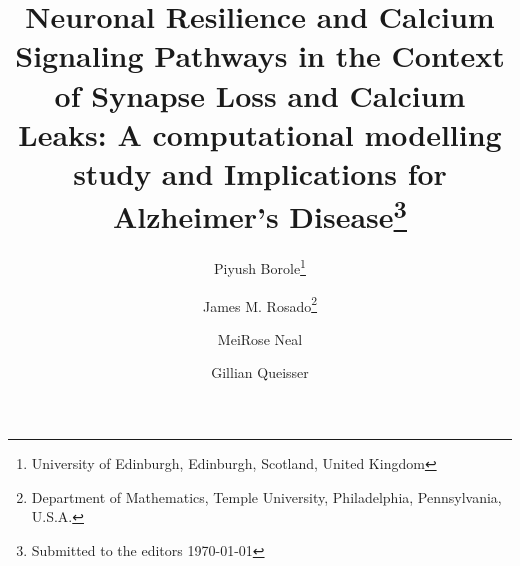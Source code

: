 

\usepackage{lipsum}
\usepackage{amsfonts}
\usepackage{graphicx}
\usepackage{epstopdf}
\usepackage{algorithmic}
\ifpdf
\else
\fi

\newcommand{\creflastconjunction}{, and~}
\newcommand{\IP}{IP$_3$}
\newcommand{\Ca}{$\textrm{Ca}^{2+}$~}
\newcommand{\R}{\mathbb{R}}
\newcommand{\cc}{$c_c$}
\newcommand{\ce}{$c_e$}
\newcommand{\co}{$c_o$}
\newcommand{\btot}{$b^{tot}$}
\newcommand{\betot}{$b_e^{tot}$}
\newcommand{\Dc}{$D_c$}
\newcommand{\Db}{$D_b$}
\newcommand{\Dce}{$D_{ce}$}
\newcommand{\Dbe}{$D_{be}$}
\newcommand{\ER}{Endoplasmic Reticulum}



\title{Neuronal Resilience and Calcium Signaling Pathways in the Context of Synapse Loss and Calcium Leaks: A computational modelling study and Implications for Alzheimer's Disease\thanks{Submitted to the editors \today}}

\author{
Piyush Borole\thanks{University of Edinburgh, Edinburgh, Scotland, United Kingdom}
\and James M. Rosado\thanks{Department of Mathematics, Temple University, Philadelphia, Pennsylvania, U.S.A.}
\and MeiRose Neal\footnotemark[3]
 \and Gillian Queisser\footnotemark[3] 
}
\usepackage{amsopn}
\DeclareMathOperator{\diag}{diag}

